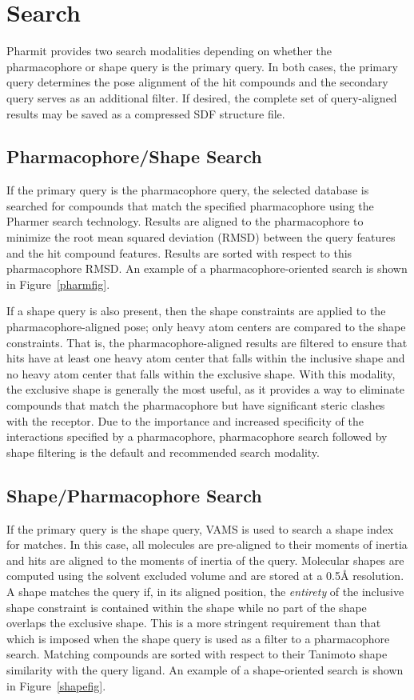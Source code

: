 \section{Search}

Pharmit provides two search modalities depending on whether the pharmacophore or shape query is the primary query.  In both cases, the primary query determines the pose alignment of the hit compounds and the secondary query serves as an additional filter.
If desired, the complete set of query-aligned results may be saved as a compressed SDF structure file.

\subsection{Pharmacophore/Shape Search}

If the primary query is the pharmacophore query, the selected database is searched for compounds that match the specified pharmacophore using the Pharmer \cite{Koes_2011} search technology.  Results are aligned to the pharmacophore to minimize the root mean squared deviation (RMSD) between the query features and the hit compound features. Results are sorted with respect to this pharmacophore RMSD. An example of a pharmacophore-oriented search is shown in Figure~\ref{pharmfig}.

If a shape query is also present, then the shape constraints are applied to the pharmacophore-aligned pose; only heavy atom centers are compared to the shape constraints.  That is, the pharmacophore-aligned results are filtered to ensure that hits have at least one heavy atom center that falls within the inclusive shape and no heavy atom center that falls within the exclusive shape.  With this modality, the exclusive shape is generally the most useful, as it provides a way to eliminate compounds that match the pharmacophore but have significant steric clashes with the receptor.
Due to the importance and increased specificity of the interactions specified by a pharmacophore, pharmacophore search followed by shape filtering is the default and recommended search modality.  

\subsection{Shape/Pharmacophore Search}

If the primary query is the shape query, VAMS \cite{vams} is used to search a shape index \cite{matchpack} for matches.  In this case, all molecules are pre-aligned to their moments of inertia and hits are aligned to the moments of inertia of the query.  Molecular shapes are computed using the solvent excluded volume and are stored at a 0.5{\AA} resolution. A shape matches the query if, in its aligned position, the \textit{entirety} of the inclusive shape constraint is contained within the shape while no part of the shape overlaps the exclusive shape.  This is a more stringent requirement than that which is imposed when the shape query is used as a filter to a pharmacophore search.
Matching compounds are sorted with respect to their Tanimoto shape similarity with the query ligand. An example of a shape-oriented search is shown in Figure~\ref{shapefig}.

